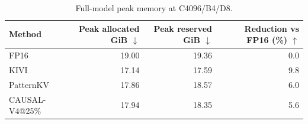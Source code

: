 \begin{table}[t]
\centering
\small
\caption{Full-model peak memory at C4096/B4/D8.}
\label{tab:matched-memory}
\begin{tabular}{lrrr}
\toprule
Method & Peak allocated GiB $\downarrow$ & Peak reserved GiB $\downarrow$ & Reduction vs FP16 (\%) $\uparrow$ \\
\midrule
FP16 & 19.00 & 19.36 & 0.0 \\
KIVI & 17.14 & 17.59 & 9.8 \\
PatternKV & 17.86 & 18.57 & 6.0 \\
CAUSAL-V4@25\% & 17.94 & 18.35 & 5.6 \\
\bottomrule
\end{tabular}
\end{table}
